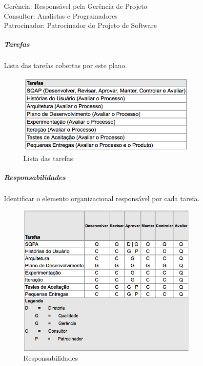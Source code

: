 Gerência: Responsável pela Gerência de Projeto \\

Consultor: Analistas e Programadores \\

Patrocinador: Patrocinador do Projeto de Software \\

\subparagraph{Tarefas}

Lista das tarefas cobertas por este plano.

\begin{figure}[H]
  \centering
  \includegraphics[width=0.8\textwidth]{softwareengineer/images/task-list} 
  \caption{Lista das tarefas}
  \label{fig:task-list} 
\end{figure}

\subparagraph{Responsabilidades}

Identificar o elemento organizacional responsável por cada tarefa.

\begin{figure}[H]
  \centering
  \includegraphics[width=0.8\textwidth]{softwareengineer/images/responsibilities-quality} 
  \caption{Responsabilidades}
  \label{fig:responsibilities-quality} 
\end{figure}

